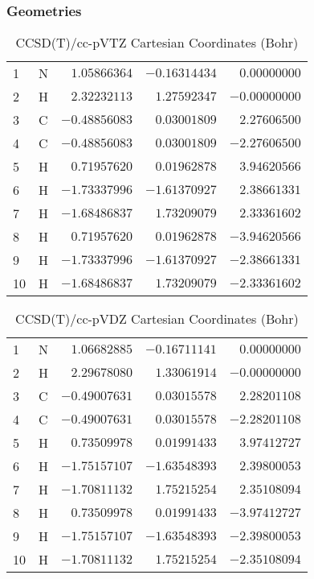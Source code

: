 \documentclass[10pt,oneside]{article}
\begin{document}
\clearpage

\subsection{\ \ \ }

\subsubsection*{Geometries}
\begin{table}[h!]
\centering
\caption{CCSD(T)/cc-pVTZ Cartesian Coordinates (Bohr)}
\begin{tabular}{llrrr}
1  & N  & $ 1.05866364$ & $-0.16314434$ & $ 0.00000000$ \\
2  & H  & $ 2.32232113$ & $ 1.27592347$ & $-0.00000000$ \\
3  & C  & $-0.48856083$ & $ 0.03001809$ & $ 2.27606500$ \\
4  & C  & $-0.48856083$ & $ 0.03001809$ & $-2.27606500$ \\
5  & H  & $ 0.71957620$ & $ 0.01962878$ & $ 3.94620566$ \\
6  & H  & $-1.73337996$ & $-1.61370927$ & $ 2.38661331$ \\
7  & H  & $-1.68486837$ & $ 1.73209079$ & $ 2.33361602$ \\
8  & H  & $ 0.71957620$ & $ 0.01962878$ & $-3.94620566$ \\
9  & H  & $-1.73337996$ & $-1.61370927$ & $-2.38661331$ \\
10 & H  & $-1.68486837$ & $ 1.73209079$ & $-2.33361602$ \\
\end{tabular}
\end{table}

\begin{table}[h!]
\centering
\caption{CCSD(T)/cc-pVDZ Cartesian Coordinates (Bohr)}
\begin{tabular}{llrrr}
1  & N  & $ 1.06682885$ & $-0.16711141$ & $ 0.00000000$ \\
2  & H  & $ 2.29678080$ & $ 1.33061914$ & $-0.00000000$ \\
3  & C  & $-0.49007631$ & $ 0.03015578$ & $ 2.28201108$ \\
4  & C  & $-0.49007631$ & $ 0.03015578$ & $-2.28201108$ \\
5  & H  & $ 0.73509978$ & $ 0.01991433$ & $ 3.97412727$ \\
6  & H  & $-1.75157107$ & $-1.63548393$ & $ 2.39800053$ \\
7  & H  & $-1.70811132$ & $ 1.75215254$ & $ 2.35108094$ \\
8  & H  & $ 0.73509978$ & $ 0.01991433$ & $-3.97412727$ \\
9  & H  & $-1.75157107$ & $-1.63548393$ & $-2.39800053$ \\
10 & H  & $-1.70811132$ & $ 1.75215254$ & $-2.35108094$ \\
\end{tabular}
\end{table}
\end{document}
